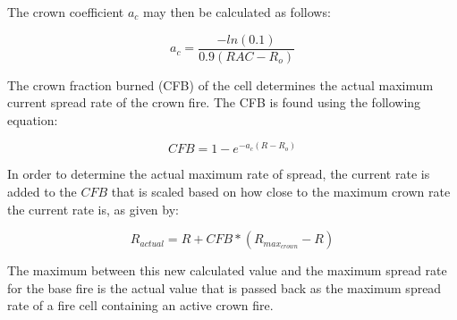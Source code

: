 The crown coefficient $a_c$ may then be calculated as follows:

\begin{equation}
a_c = \frac{-ln(0.1)}{0.9(RAC - R_o)}
\end{equation}

The crown fraction burned (CFB) of the cell determines the actual maximum current spread rate of the crown fire. The CFB is found using the following equation: 

\begin{equation}
CFB = 1 - e^{-a_c(R-R_o)}
\end{equation}

In order to determine the actual maximum rate of spread, the current rate is added to the $CFB$ that is scaled based on how close to the maximum crown rate the current rate is, as given by: 

\begin{equation}
R_{actual} = R + CFB * (R_{max_{crown}} - R)
\end{equation}

The maximum between this new calculated value and the maximum spread rate for the base fire is the actual value that is passed back as the maximum spread rate of a fire cell containing an active crown fire. 

